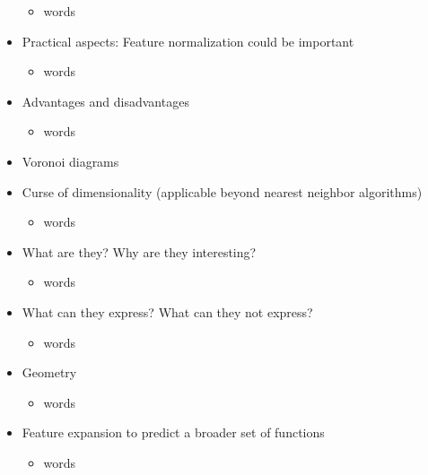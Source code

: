 \documentclass{article}
\begin{document}
\begin{itemize}
\begin{itemize}
	\item words
	\end{itemize}
\item Practical aspects: Feature normalization could be important
	\begin{itemize}
	\item words
	\end{itemize}
\item Advantages and disadvantages
	\begin{itemize}
	\item words
	\end{itemize}\item Voronoi diagrams
\item Curse of dimensionality (applicable beyond nearest neighbor algorithms)
	\begin{itemize}
	\item words
	\end{itemize}
\end{itemize}

\hspace{-1.5em}{\large \bf Linear Classifiers}
\begin{itemize}
\item What are they? Why are they interesting?
	\begin{itemize}
	\item words
	\end{itemize}
\item What can they express? What can they not express?
	\begin{itemize}
	\item words
	\end{itemize}
\item Geometry
	\begin{itemize}
	\item words
	\end{itemize}
\item Feature expansion to predict a broader set of functions
	\begin{itemize}
	\item words
	\end{itemize}
\end{itemize}
\end{document}
